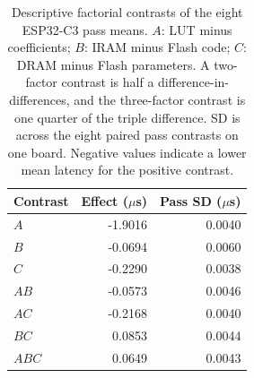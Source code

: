 \begin{table}[t]
\centering
\caption{Descriptive factorial contrasts of the eight ESP32-C3 pass means. $A$: LUT minus coefficients; $B$: IRAM minus Flash code; $C$: DRAM minus Flash parameters. A two-factor contrast is half a difference-in-differences, and the three-factor contrast is one quarter of the triple difference. SD is across the eight paired pass contrasts on one board. Negative values indicate a lower mean latency for the positive contrast.}
\label{tab:c3-factorial}
\begin{tabular}{lrr}
\toprule
Contrast & Effect ($\mu$s) & Pass SD ($\mu$s)\\
\midrule
$A$ & -1.9016 & 0.0040\\
$B$ & -0.0694 & 0.0060\\
$C$ & -0.2290 & 0.0038\\
$AB$ & -0.0573 & 0.0046\\
$AC$ & -0.2168 & 0.0040\\
$BC$ & 0.0853 & 0.0044\\
$ABC$ & 0.0649 & 0.0043\\
\bottomrule
\end{tabular}
\end{table}
